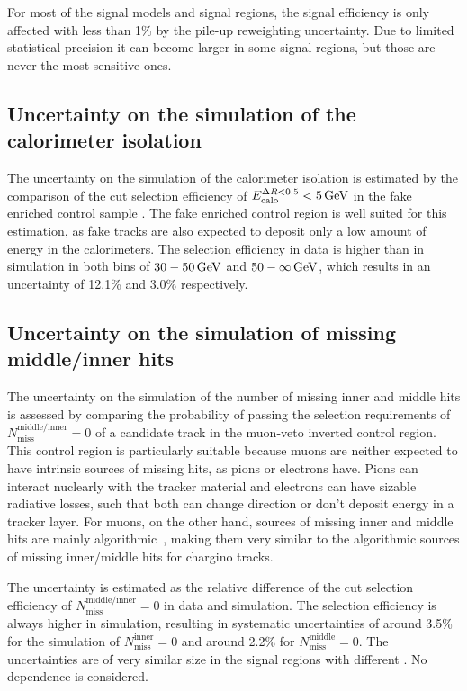 For most of the signal models and signal regions, the signal efficiency is only affected with less than 1\% by the pile-up reweighting uncertainty.
Due to limited statistical precision it can become larger in some signal regions, but those are never the most sensitive ones. 


\subsection*{Uncertainty on the simulation of the calorimeter isolation}
The uncertainty on the simulation of the calorimeter isolation \ecalo is estimated by the comparison of the cut selection efficiency of $E^{\Delta R<0.5}_{\text{calo}}<5\,\text{Ge}\kern-0.06667em\text{V}$ in the fake enriched control sample \fakeCR.
The fake enriched control region is well suited for this estimation, as fake tracks are also expected to deposit only a low amount of energy in the calorimeters.
The selection efficiency in data is higher than in simulation in both \pt bins of $30-50\,\text{Ge}\kern-0.06667em\text{V}$ and $50-\infty\,\text{Ge}\kern-0.06667em\text{V}$, which results in an uncertainty of 12.1\% and 3.0\% respectively.


\subsection*{Uncertainty on the simulation of missing middle/inner hits}
The uncertainty on the simulation of the number of missing inner and middle hits is assessed by comparing the probability of passing the selection requirements of $N_{\text{miss}}^{\text{middle/inner}}=0$
of a candidate track in the muon-veto inverted control region. 
This control region is particularly suitable because muons are neither expected to have intrinsic sources of missing hits, as pions or electrons have.
Pions can interact nuclearly with the tracker material and electrons can have sizable radiative losses, such that both can change direction or don't deposit energy in a tracker layer.
For muons, on the other hand, sources of missing inner and middle hits are mainly algorithmic~\cite{bib:CMS:DT_Thesis,bib:CMS:DT_8TeV_AN}, 
making them very similar to the algorithmic sources of missing inner/middle hits for chargino tracks.

The uncertainty is estimated as the relative difference of the cut selection efficiency of $N_{\text{miss}}^{\text{middle/inner}}=0$ in data and simulation.
The selection efficiency is always higher in simulation, resulting in systematic uncertainties of around 3.5\% for the simulation of $N_{\text{miss}}^{\text{inner}}=0$ and around 2.2\% for $N_{\text{miss}}^{\text{middle}}=0$.
The uncertainties are of very similar size in the signal regions with different \pt.
No \ias dependence is considered.

